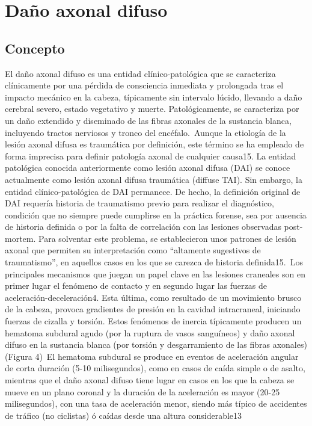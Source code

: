 \section{Daño axonal difuso}
\subsection{Concepto}
El daño axonal difuso es una entidad clínico-patológica que se caracteriza clínicamente por una pérdida de consciencia inmediata y prolongada tras el impacto mecánico en la cabeza, típicamente sin intervalo lúcido, llevando a daño cerebral severo, estado vegetativo y muerte. Patológicamente, se caracteriza por un daño extendido y diseminado de las fibras axonales de la sustancia blanca, incluyendo tractos nerviosos y tronco del encéfalo.\
Aunque la etiología de la lesión axonal difusa es traumática por definición, este término se ha empleado de forma imprecisa para definir patología axonal de cualquier causa15. La entidad patológica conocida anteriormente como lesión axonal difusa (DAI) se conoce actualmente como lesión axonal difusa traumática (diffuse TAI). Sin embargo, la entidad clínico-patológica de DAI permanece. De hecho, la definición original de DAI requería historia de traumatismo previo para realizar el diagnóstico, condición que no siempre puede cumplirse en la práctica forense, sea por ausencia de historia definida o por la falta de correlación con las lesiones observadas post-mortem. Para solventar este problema, se establecieron unos patrones de lesión axonal que permiten su interpretación como “altamente sugestivos de traumatismo”, en aquellos casos en los que se carezca de historia definida15.\
Los principales mecanismos que juegan un papel clave en las lesiones craneales son en primer lugar el fenómeno de contacto y en segundo lugar las fuerzas de aceleración-deceleración4. Esta última, como resultado de un movimiento brusco de la cabeza, provoca gradientes de presión en la cavidad intracraneal, iniciando fuerzas de cizalla y torsión. Estos fenómenos de inercia típicamente producen un hematoma subdural agudo (por la ruptura de vasos sanguíneos) y daño axonal difuso en la sustancia blanca (por torsión y desgarramiento de las fibras axonales) (Figura 4)\
El hematoma subdural se produce en eventos de aceleración angular de corta duración (5-10 milisegundos), como en casos de caída simple o de asalto, mientras que el daño axonal difuso tiene lugar en casos en los que la cabeza se mueve en un plano coronal y la duración de la aceleración es mayor (20-25 milisegundos), con una tasa de aceleración menor, siendo más típico de accidentes de tráfico (no ciclistas) ó caídas desde una altura considerable13\

